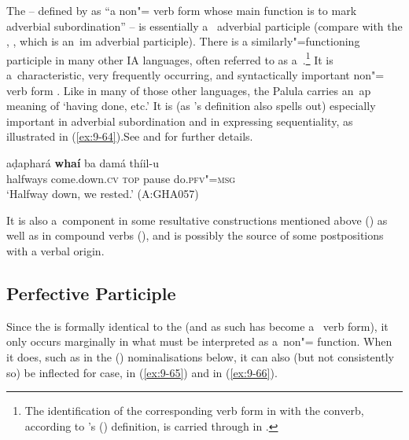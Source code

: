 The  -- defined by \citet{haspelmath1995} as ``a non"= verb form whose main function is to mark adverbial subordination'' -- is essentially a~ adverbial participle (compare with the , , which is an~im adverbial participle). There is a similarly"=functioning participle in many other IA languages, often referred to as a~.\footnote{The identification of the corresponding verb form in \iliKohistani \iliShina with the converb, according to \citeauthor{haspelmath1995}'s (\citeyear{haspelmath1995}) definition, is carried through in \citealt{schmidt2003}.} It is  a~characteristic, very frequently occurring, and syntactically important non"= verb form \citep[323, 397--401]{masica1991}. Like in many of those other languages, the Palula  carries an~ap meaning of `having done, etc.' It is (as \citeauthor{haspelmath1995}'s definition also spells out) especially important in adverbial subordination and in expressing  sequentiality, as illustrated in (\ref{ex:9-64}).See  and  for further details.

\begin{exe}
\ex
\label{ex:9-64}
\gll aḍaphará \textbf{whaí} ba damá thíil-u \\
halfways come.down.\textsc{cv} \textsc{top} pause do.\textsc{pfv"=msg} \\
\glt `Halfway down, we rested.' (A:GHA057)
\end{exe}

It is also a~component in some resultative constructions mentioned above () as well as in compound verbs (), and is possibly the source of some postpositions with a verbal origin.


\subsection{Perfective Participle}
\label{subsec:9-3-2}


Since the  is formally identical to the  (and as such has become a~ verb form), it only occurs marginally in what must be interpreted as a~non"= function. When it does, such as in the () nominalisations below, it can also (but not consistently so) be inflected for case,  in (\ref{ex:9-65}) and  in (\ref{ex:9-66}).

